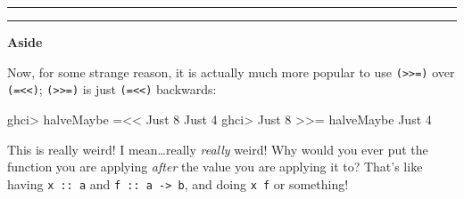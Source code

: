 \documentclass[]{article}
\newenvironment{Shaded}{}{}
\newcommand{\DataTypeTok}[1]{\textcolor[rgb]{0.56,0.13,0.00}{{#1}}}
\newcommand{\DecValTok}[1]{\textcolor[rgb]{0.25,0.63,0.44}{{#1}}}
\newcommand{\FunctionTok}[1]{\textcolor[rgb]{0.02,0.16,0.49}{{#1}}}
\newcommand{\NormalTok}[1]{{#1}}
\begin{document}
\begin{center}\rule{0.5\linewidth}{\linethickness}\end{center}

\begin{center}\rule{0.5\linewidth}{\linethickness}\end{center}

\textbf{Aside}

Now, for some strange reason, it is actually much more popular to use
\texttt{(\textgreater{}\textgreater{}=)} over
\texttt{(=\textless{}\textless{})};
\texttt{(\textgreater{}\textgreater{}=)} is just
\texttt{(=\textless{}\textless{})} backwards:

\begin{Shaded}
\begin{Highlighting}[]
\NormalTok{ghci}\FunctionTok{>} \NormalTok{halveMaybe }\FunctionTok{=<<} \DataTypeTok{Just} \DecValTok{8}
\DataTypeTok{Just} \DecValTok{4}
\NormalTok{ghci}\FunctionTok{>} \DataTypeTok{Just} \DecValTok{8} \FunctionTok{>>=} \NormalTok{halveMaybe}
\DataTypeTok{Just} \DecValTok{4}
\end{Highlighting}
\end{Shaded}

This is really weird! I mean\ldots{}really \emph{really} weird! Why
would you ever put the function you are applying \emph{after} the value
you are applying it to? That's like having \texttt{x\ ::\ a} and
\texttt{f\ ::\ a\ -\textgreater{}\ b}, and doing \texttt{x\ f} or
something!
\end{document}
